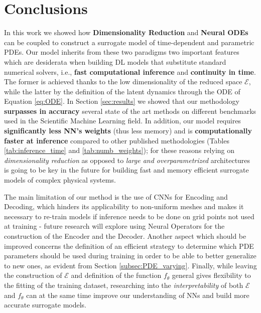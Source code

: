 \section{Conclusions}
In this work we showed how \textbf{Dimensionality Reduction} and \textbf{Neural ODEs} can be coupled to construct a surrogate model of time-dependent and parametric PDEs. Our model inherits from these two paradigms two important features which are desiderata when building DL models that substitute standard numerical solvers, i.e.,  \textbf{fast computational inference} and \textbf{continuity in time}. The former is achieved thanks to the low dimensionality of the reduced space $\mathcal{E}$, while the latter by the definition of the latent dynamics through the ODE of Equation \ref{eq:ODE}. In Section \ref{sec:results} we showed that our methodology \textbf{surpasses in accuracy} several state of the art methods on different benchmarks used in the Scientific Machine Learning field. In addition, our model requires \textbf{significantly less NN's weights} (thus less memory) and is \textbf{computationally faster at inference} compared to other published methodologies (Tables \ref{tab:inference_time} and \ref{tab:numb_weights}); for these reasons relying on \textit{dimensionality reduction} as opposed to \textit{large and overparametrized} architectures is going to be key in the future for building fast and memory efficient surrogate models of complex physical systems. 


The main limitation of our method is the use of CNNs for Encoding and Decoding, which hinders its applicability to non-uniform meshes and makes it necessary to re-train models if inference needs to be done on grid points not used at training - future research will explore using Neural Operators for the construction of the Encoder and the Decoder. Another aspect which should be improved concerns the definition of an efficient strategy to determine which PDE parameters should be used during training in order to be able to better generalize to new ones, as evident from Section \ref{subsec:PDE_varying}. Finally, while leaving the construction of $\mathcal{E}$ and definition of the function $f_\theta$ general gives flexibility to the fitting of the training dataset, researching into the \textit{interpretability} of both $\mathcal{E}$ and $f_\theta$ can at the same time improve our understanding of NNs and build more accurate surrogate models.

